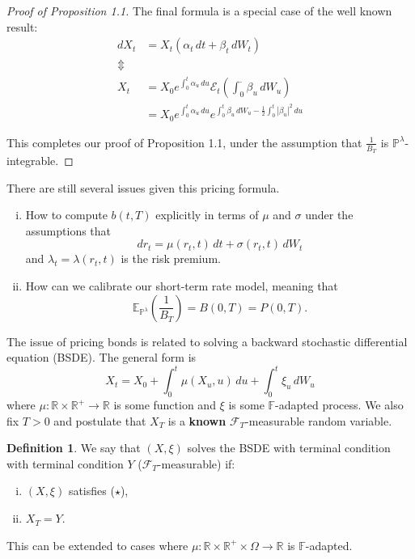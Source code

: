 \documentclass[10pt, oneside, reqno]{amsbook}
\theoremstyle{plain}%
\theoremstyle{definition}
\newtheorem{defn}[thm]{Definition}
\theoremstyle{remark}
\newcommand{\sigf}{\mathcal{F}}
\newcommand{\Q}{\mathbb{Q}}
\newcommand{\R}{\mathbb{R}}
\newcommand{\E}{\mathbb{E}}
\renewcommand{\P}{\mathbb{P}}
\newcommand{\F}{\mathbb{F}}
\newcommand{\doleans}[1]{\mathcal E_t \left(\int_0^\cdot #1 \right)}
\numberwithin{equation}{chapter}
\begin{document}
\begin{proof}[Proof of Proposition 1.1]
The final formula is a special case of the well known result:
\begin{align*}
	dX_t 	&= X_t (\alpha_t \, dt + \beta_t \, dW_t) \\
				\Updownarrow  \\
		X_t	&= X_0 e^{\int_0^t \alpha_u \, du} \doleans {\beta_u \, dW_u }  \\
			&= X_0 e^{\int_0^t \alpha_u \, du} e^{\int_0^t \beta_u \, dW_u - \frac{1}{2} \int_0^t |\beta_u|^2 \, du}
		\end{align*}
		
	This completes our proof of Proposition 1.1, under the assumption that $\frac{1}{B_T}$ is $\P^\lambda$-integrable.
\end{proof}

There are still several issues given this pricing formula. 
\begin{enumerate}[(i)]
	\item How to compute $b(t, T)$ explicitly in terms of $\mu$ and $\sigma$ under the assumptions that \[
		dr_t = \mu(r_t, t) \, dt + \sigma(r_t, t) \, dW_t
	\] and $\lambda_t = \lambda(r_t, t)$ is the risk premium.  
	\item How can we calibrate our short-term rate model, meaning that \[
		\E_{\P^\lambda}\left( \frac{1}{B_T} \right) = B(0, T) = P(0, T).
	\]
\end{enumerate}  

The issue of pricing bonds is related to solving a backward stochastic differential equation (BSDE).  The general form is \[
	X_t = X_0 + \int_0^t \mu (X_u, u) \, du + \int_0^t \xi_u \, dW_u \tag{$\star$}
\]   where $\mu : \R \times \R^+ \rightarrow \R$ is some function and $\xi$ is some $\F$-adapted process.  We also fix $T > 0$ and postulate that $X_T$ is a \textbf{known } $\sigf_T$-measurable random variable. 

\begin{defn}
	We say that $(X, \xi)$ solves the BSDE with terminal condition with terminal condition $Y$ ($\sigf_T$-measurable) if: 
	\begin{enumerate}[(i)]
		\item $(X, \xi)$ satisfies ($\star$), 
		\item $X_T = Y$.  
	\end{enumerate}
	
	This can be extended to cases where $\mu : \R \times \R^+ \times \Omega \rightarrow \R$ is $\F$-adapted.
\end{defn}
\end{document}

